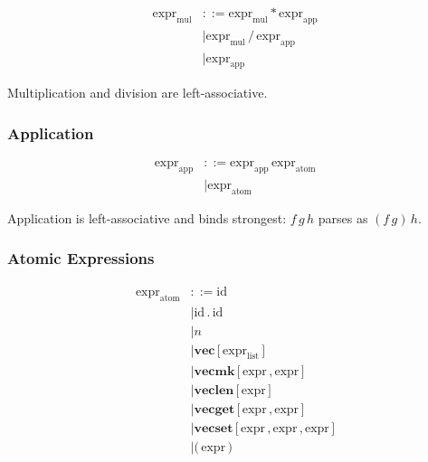 \documentclass[12pt]{article}
\begin{document}
\begin{align*}
\text{expr}_{\text{mul}} &::= \text{expr}_{\text{mul}} \, \textbf{*} \, \text{expr}_{\text{app}} \\
                         &\mid \text{expr}_{\text{mul}} \, \textbf{/} \, \text{expr}_{\text{app}} \\
                         &\mid \text{expr}_{\text{app}}
\end{align*}

Multiplication and division are left-associative.

\subsubsection{Application}

\begin{align*}
\text{expr}_{\text{app}} &::= \text{expr}_{\text{app}} \, \text{expr}_{\text{atom}} \\
                         &\mid \text{expr}_{\text{atom}}
\end{align*}

Application is left-associative and binds strongest: $f \, g \, h$ parses as $(f \, g) \, h$.

\subsubsection{Atomic Expressions}

\begin{align*}
\text{expr}_{\text{atom}} &::= \text{id} \\
                          &\mid \text{id} \, \texttt{.} \, \text{id} \\
                          &\mid n \\
                          &\mid \textbf{vec} \, \texttt{[} \, \text{expr}_{\text{list}} \, \texttt{]} \\
                          &\mid \textbf{vecmk} \, \texttt{[} \, \text{expr} \, \texttt{,} \, \text{expr} \, \texttt{]} \\
                          &\mid \textbf{veclen} \, \texttt{[} \, \text{expr} \, \texttt{]} \\
                          &\mid \textbf{vecget} \, \texttt{[} \, \text{expr} \, \texttt{,} \, \text{expr} \, \texttt{]} \\
                          &\mid \textbf{vecset} \, \texttt{[} \, \text{expr} \, \texttt{,} \, \text{expr} \, \texttt{,} \, \text{expr} \, \texttt{]} \\
                          &\mid \textbf{(} \, \text{expr} \, \textbf{)}
\end{align*}
\end{document}
